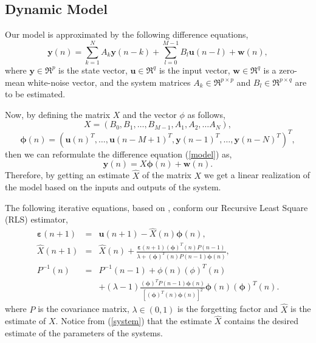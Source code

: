 \documentclass{sig-alternate}
\begin{document}
\subsection{Dynamic Model}
Our model is approximated by the following difference equations,
\begin{equation}
 \mathbf{y}(n) = \sum_{k=1}^{N}A_{k}\mathbf{y}(n-k)+ \sum_{l=0}^{M-1}B_{l}\mathbf{u}(n-l) + \mathbf{w}(n),
 \label{model}
\end{equation}
where $\mathbf{y} \in \Re^{p}$ is the state vector, $\mathbf{u} \in \Re^{q}$ is the input vector, 
$\mathbf{w} \in \Re^{q}$ is a zero-mean white-noise vector, 
and the system matrices $A_{k} \in \Re^{p \times p}$ and $B_{l} \in \Re^{p \times q}$ 
are to be estimated.

Now, by defining the matrix $X$ and the vector $\phi$ as follows,
\begin{equation}
 X = \left( B_{0},B_{1},\ldots,B_{M-1},A_{1},A_{2},\ldots A_{N} \right),
 \label{system}
\end{equation}
\begin{displaymath}
 \mathbf{\phi}(n) = ( \mathbf{u}(n)^{T},\ldots,\mathbf{u}(n-M+1)^{T},\mathbf{y}(n-1)^{T},\dots,\mathbf{y}(n-N)^{T})^{T},
\end{displaymath}
then we can reformulate the difference equation (\ref{model}) as,
\begin{displaymath}
\mathbf{y}(n) = X\mathbf{\phi}(n) + \mathbf{w}(n).
\end{displaymath}
Therefore, by getting an estimate $\hat{X}$ of the matrix $X$ we get a linear realization of the model based on the inputs
and outputs of the system.

The following iterative equations, based on \cite{Kulhavy-1987}, conform our Recursive Least Square (RLS)
estimator,
\begin{eqnarray}
 \mathbf{\varepsilon}(n+1) & = & \mathbf{u}(n+1) - \hat{X}(n)\mathbf{\phi}(n), \nonumber \\
\hat{X}(n+1) & = & \hat{X}(n)+\frac{\mathbf{\varepsilon}(n+1)(\mathbf{\phi})^{T}(n)P(n-1)}{\lambda + (\mathbf{\phi})^{T}(n)P(n-1)\mathbf{\phi}(n)}, \nonumber \\
P^{-1}(n) & = & P^{-1}(n-1) + \phi(n)(\phi)^{T}(n) \nonumber \\
& & + (\lambda - 1) \frac{(\mathbf{\phi})^{T}P(n-1)\mathbf{\phi}(n)}{[(\mathbf{\phi})^{T}(n)\mathbf{\phi}(n)]^{2}} \mathbf{\phi}(n)(\mathbf{\phi})^{T}(n) \nonumber.
\end{eqnarray}
where $P$ is the covariance matrix, $\lambda \in (0,1)$ is the forgetting factor and $\hat{X}$ is the estimate of $X$.
Notice from (\ref{system}) that the estimate $\hat{X}$ contains the desired estimate of the parameters of the systems.
\end{document}
